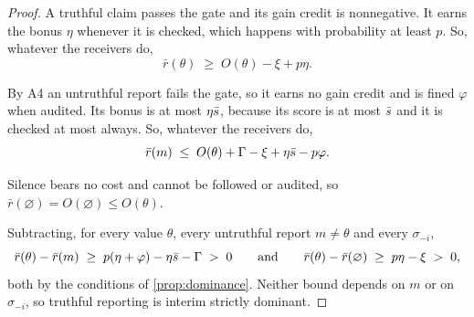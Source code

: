 \begin{proof}
A truthful claim passes the gate and its gain credit is nonnegative. It earns the bonus $\eta$ whenever it is checked, which happens with probability at least $p$. So, whatever the receivers do,
\[
  \bar r(\theta)\;\ge\;O(\theta)-\xi+p\eta .
\]

By A4 an untruthful report fails the gate, so it earns no gain credit and is fined $\varphi$ when audited. Its bonus is at most $\eta\bar s$, because its score is at most $\bar s$ and it is checked at most always. So, whatever the receivers do,
\[
  \bar r(m)\;\le\;O(\theta)+\Gamma-\xi+\eta\bar s-p\varphi .
\]

Silence bears no cost and cannot be followed or audited, so $\bar r(\varnothing)=O(\varnothing)\le O(\theta)$.

Subtracting, for every value $\theta$, every untruthful report $m\neq\theta$ and every $\sigma_{-i}$,
\[
  \bar r(\theta)-\bar r(m)\;\ge\;p(\eta+\varphi)-\eta\bar s-\Gamma\;>\;0
  \qquad\text{and}\qquad
  \bar r(\theta)-\bar r(\varnothing)\;\ge\;p\eta-\xi\;>\;0,
\]
both by the conditions of \cref{prop:dominance}. Neither bound depends on $m$ or on $\sigma_{-i}$, so truthful reporting is interim strictly dominant. 
\end{proof}





